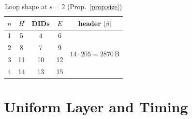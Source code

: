 \documentclass[journal]{IEEEtran}
\begin{document}
\begin{table}[t]
\caption{Loop shape at $s=2$ (Prop.~\ref{prop:size})}
\label{tab:size}
\centering\small
\begin{tabular}{@{}ccccc@{}}
\toprule
$n$ & $H$ & DIDs & $E$ & header $|\beta|$ \\
\midrule
1 & 5 & 4 & 6 & \multirow{4}{*}{$14\cdot205=2870$\,B} \\
2 & 8 & 7 & 9 & \\
3 & 11 & 10 & 12 & \\
4 & 14 & 13 & 15 & \\
\bottomrule
\end{tabular}
\end{table}

\section{Uniform Layer and Timing}\label{sec:layer}
\end{document}
